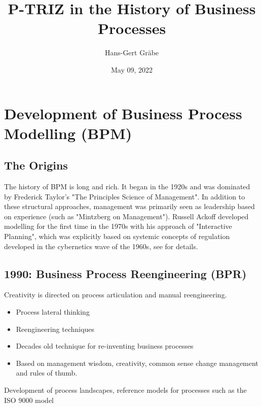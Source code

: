 \documentclass[11pt,a4paper]{article}
\title{P-TRIZ in the History of Business Processes}
\author{Hans-Gert Gr\"abe}
\date{May 09, 2022}
\begin{document}
\maketitle

\section{Development of Business Process Modelling (BPM)}

\subsection{The Origins}

The history of BPM is long and rich. It began in the 1920s and was dominated
by Frederick Taylor’s "The Principles Science of Management".  In addition to
these structural approaches, management was primarily seen as leadership based
on experience (such as "Mintzberg on Management"). Russell Ackoff developed
modelling for the first time in the 1970s with his approach of "Interactive
Planning", which was explicitly based on systemic concepts of regulation
developed in the cybernetics wave of the 1960s, see \cite{Notes-S21} for
details.

\subsection{1990: Business Process Reengineering (BPR)}
Creativity is directed on process articulation and manual reengineering. 
\begin{itemize}
\item Process lateral thinking
\item Reengineering techniques
\item Decades old technique for re-inventing business processes
\item Based on management wisdom, creativity, common sense change management
  and rules of thumb.
\end{itemize}
Development of process landscapes, reference models for processes such as the
ISO 9000 model
\end{document}
